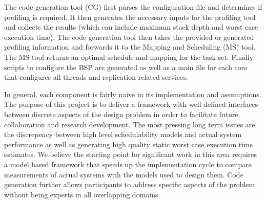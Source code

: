 	The code generation tool (CG) first parses the configuration file and determines if profiling is required. 
	It then generates the necessary inputs for the profiling tool and collects the results (which can include maximum stack depth and worst case execution time). 
	The code generation tool then takes the provided or generated profiling information and forwards it to the Mapping and Scheduling (MS) tool. 
	The MS tool returns an optimal schedule and mapping for the task set. 
	Finally scripts to configure the BSP are generated as well as a main file for each core that configures all threads and replication related services. 	
	
	
	
	In general, each component is fairly naive in its implementation and assumptions. 
	The purpose of this project is to deliver a framework with well defined interfaces between discrete aspects of the design problem in order to facilitate future collaboration and research development. 
	The most pressing long term issues are the discrepency between high level schedulability models and actual system performance as well as generating high quality static worst case execution time estimates.
	We believe the starting point for significant work in this area requires a model based framework that speeds up the implementation cycle to compare measurements of actual systems with the models used to design them.
	Code generation further allows participants to address specific aspects of the problem without being experts in all overlapping domains.

